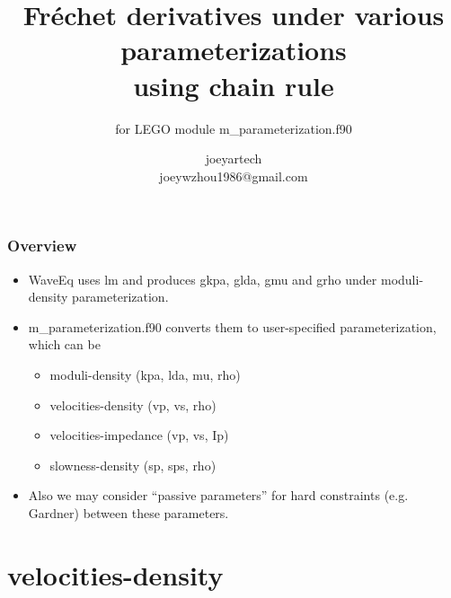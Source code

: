 \documentclass[9pt]{beamer}
\title[]{Fr\'echet derivatives under various parameterizations \\ using chain rule}
\subtitle{for LEGO module m\_parameterization.f90}
\author[joey]{joeyartech\\
\scriptsize{joeywzhou1986@gmail.com}}
\institute[]{Department of Geosciences, The University of Texas at Dallas}
\begin{document}

\maketitle \clearpage


\begin{frame}\frametitle{Overview}
  
  \begin{itemize}
    \item WaveEq uses lm and produces gkpa, glda, gmu and grho under moduli-density parameterization.
    \item m\_parameterization.f90 converts them to user-specified parameterization, which can be
    \begin{itemize}
      \item moduli-density (kpa, lda, mu, rho)
      \item velocities-density (vp, vs, rho)
      \item velocities-impedance (vp, vs, Ip)
      \item slowness-density (sp, sps, rho)
    \end{itemize}
    \item Also we may consider ``passive parameters'' for hard constraints (e.g. Gardner) between these parameters.
  \end{itemize}

\end{frame}

\section{velocities-density}
\end{document}
